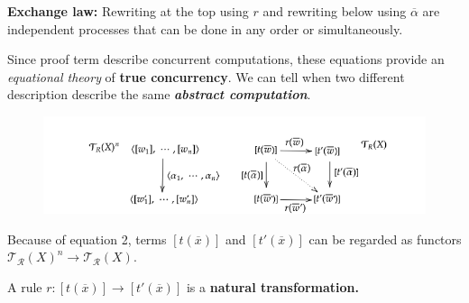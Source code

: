 \documentclass{beamer}
\begin{document}
\begin{frame}
    \small
    \textbf{Exchange law:} Rewriting at the top using $r$ and rewriting below using $\overline{\alpha}$
    are independent processes that can be done in any order or simultaneously.
    
    \bigskip
    Since proof term describe concurrent computations, these equations provide 
    an \emph{equational theory} of \textbf{true concurrency}. We can tell when two different description 
    describe the same \textbf{\emph{abstract computation}}.
    
    \pause
    \begin{figure}
        
        \includegraphics[width=\textwidth, height=\textheight,keepaspectratio]{img/nattr.png}
    \end{figure}
    \bigskip
   Because of equation 2, terms $[t(\overline{x})]$ and $[t'(\overline{x})]$ can be regarded as 
   functors $\mathcal{T_R}(X)^n \rightarrow \mathcal{T_R}(X)$. 

   \medskip
   A rule $r: [t(\overline{x})] \rightarrow [t'(\overline{x})]$ is a  \textbf{natural transformation.}



\end{frame}
\end{document}

